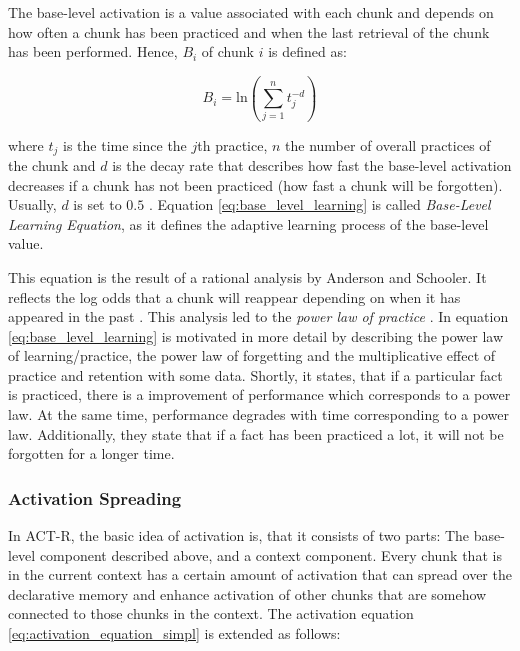 The base-level activation is a value associated with each chunk and depends on how often a chunk has been practiced and when the last retrieval of the chunk has been performed. Hence, $B_i$ of chunk $i$ is defined as:

\begin{equation}
\label{eq:base_level_learning}
B_i = \mathrm{ln}\left(\sum_{j=1}^n{t_j^{-d}}\right)
\end{equation}

where $t_j$ is the time since the $j$th practice, $n$ the number of overall practices of the chunk and $d$ is the decay rate that describes how fast the base-level activation decreases if a chunk has not been practiced (how fast a chunk will be forgotten). Usually, $d$ is set to $0.5$ \cite[p. 1042]{anderson_integrated_2004}. Equation \eqref{eq:base_level_learning} is called \emph{Base-Level Learning Equation}, as it defines the adaptive learning process of the base-level value.

This equation is the result of a rational analysis by Anderson and Schooler. It reflects the log odds that a chunk will reappear depending on when it has appeared in the past \cite[p. 33]{taatgen_modeling_2006}. This analysis led to the \emph{power law of practice} \cite[p. 1042]{anderson_integrated_2004}. In \cite[pp. 8--11]{anderson_implications_2000} equation \eqref{eq:base_level_learning} is motivated in more detail by describing the power law of learning/practice, the power law of forgetting and the multiplicative effect of practice and retention with some data. Shortly, it states, that if a particular fact is practiced, there is a improvement of performance which corresponds to a power law. At the same time, performance degrades with time corresponding to a power law. Additionally, they state that if a fact has been practiced a lot, it will not be forgotten for a longer time.

\subsubsection{Activation Spreading}
\label{activation_spreading}

In ACT-R, the basic idea of activation is, that it consists of two parts: The base-level component described above, and a context component. Every chunk that is in the current context has a certain amount of activation that can spread over the declarative memory and enhance activation of other chunks that are somehow connected to those chunks in the context. The activation equation \eqref{eq:activation_equation_simpl} is extended as follows:

